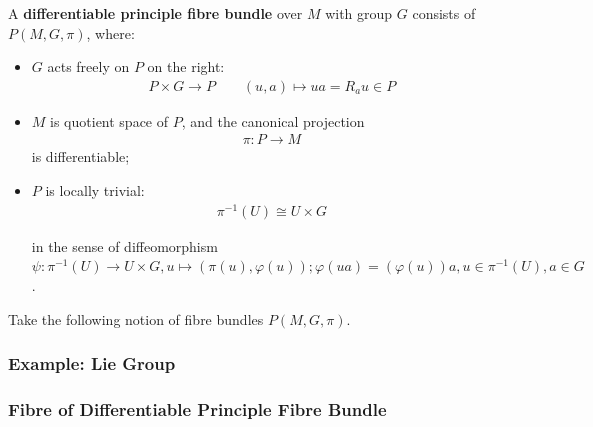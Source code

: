 \documentclass[Total.tex]{subfiles}
\begin{document}
				\begin{Def}
					A \textbf{differentiable principle fibre bundle} over $M$ with group $G$ consists of $P(M,G,\pi)$, where:
					
					\begin{itemize}
						\item $G$ acts freely on $P$ on the right:
						\begin{gather*}
							P\times G\rightarrow P\qquad(u,a)\mapsto ua=R_au\in P
						\end{gather*}
						\item $M$ is quotient space of $P$, and the canonical projection
						\begin{gather*}
							\pi:P\rightarrow M
						\end{gather*}
						is differentiable;
						\item $P$ is locally trivial:
						\begin{gather*}
							\pi^{-1}(U)\cong U\times G
						\end{gather*}
						
						in the sense of diffeomorphism $\psi:\pi^{-1}(U)\rightarrow U\times G,u\mapsto (\pi(u),\varphi(u));\varphi(ua)=(\varphi(u))a,u\in\pi^{-1}(U),a\in G$. 
					\end{itemize}
					
					Take the following notion of fibre bundles $P(M,G,\pi)$. 
				\end{Def}
				
				\subsubsection{Example: Lie Group}
				
				\subsubsection{Fibre of Differentiable Principle Fibre Bundle}
				
\end{document}
